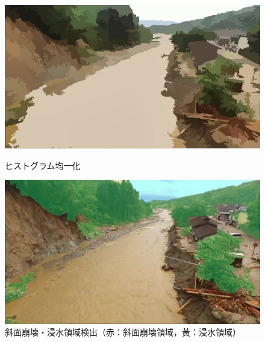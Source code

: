 \documentclass[a4paper, twocolumn, xelatex, 10pt, ja=standard, Ligatures=TeX]{bxjsarticle}
\begin{document}
		\begin{figure}[b]
			\begin{minipage}{0.48\hsize}
				\centering
				\includegraphics[width=\linewidth]{img/contrast.jpg}
				\caption{ヒストグラム均一化}
				\label{img03}
			\end{minipage}
			\begin{minipage}{0.48\hsize}
				\centering
				\includegraphics[width=\linewidth]{img/segmentation.jpg}
				\caption{斜面崩壊・浸水領域検出（赤：斜面崩壊領域，黃：浸水領域）}
				\label{img04}
			\end{minipage}
		\end{figure}
\end{document}
